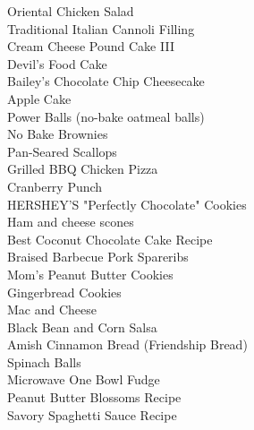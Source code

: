 \documentclass[11pt, twoside, openany]{book}
\begin{document}
Oriental Chicken Salad\hrulefill\pageref{oriental-chicken-salad}\\
Traditional Italian Cannoli Filling\hrulefill\pageref{traditional-italian-cannoli-filling}\\
Cream Cheese Pound Cake III\hrulefill\pageref{cream-cheese-pound-cake-iii}\\
Devil's Food Cake\hrulefill\pageref{devil's-food-cake}\\
Bailey's Chocolate Chip Cheesecake\hrulefill\pageref{bailey's-chocolate-chip-cheesecake}\\
Apple Cake\hrulefill\pageref{apple-cake}\\
Power Balls (no-bake oatmeal balls)\hrulefill\pageref{power-balls-(no-bake-oatmeal-balls)}\\
No Bake Brownies\hrulefill\pageref{no-bake-brownies}\\
Pan-Seared Scallops\hrulefill\pageref{pan-seared-scallops}\\
Grilled BBQ Chicken Pizza\hrulefill\pageref{grilled-bbq-chicken-pizza}\\
Cranberry Punch\hrulefill\pageref{cranberry-punch}\\
HERSHEY'S "Perfectly Chocolate" Cookies\hrulefill\pageref{hershey's-"perfectly-chocolate"-cookies}\\
Ham and cheese scones\hrulefill\pageref{ham-and-cheese-scones}\\
Best Coconut Chocolate Cake Recipe\hrulefill\pageref{best-coconut-chocolate-cake-recipe}\\
Braised Barbecue Pork Spareribs\hrulefill\pageref{braised-barbecue-pork-spareribs}\\
Mom's Peanut Butter Cookies\hrulefill\pageref{mom's-peanut-butter-cookies}\\
Gingerbread Cookies\hrulefill\pageref{gingerbread-cookies}\\
Mac and Cheese\hrulefill\pageref{mac-and-cheese}\\
Black Bean and Corn Salsa\hrulefill\pageref{black-bean-and-corn-salsa}\\
Amish Cinnamon Bread (Friendship Bread)\hrulefill\pageref{amish-cinnamon-bread-(friendship-bread)}\\
Spinach Balls\hrulefill\pageref{spinach-balls}\\
Microwave One Bowl Fudge\hrulefill\pageref{microwave-one-bowl-fudge}\\
Peanut Butter Blossoms Recipe\hrulefill\pageref{peanut-butter-blossoms-recipe}\\
Savory Spaghetti Sauce Recipe\hrulefill\pageref{savory-spaghetti-sauce-recipe}\\
\end{document}

